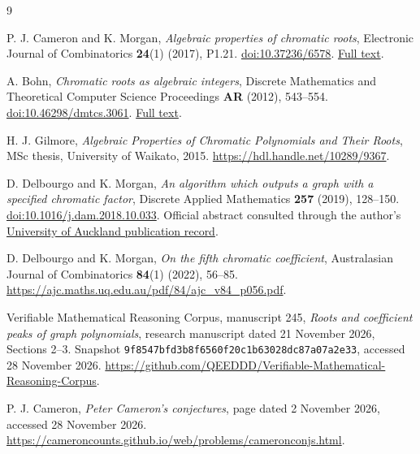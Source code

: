 \documentclass[11pt,a4paper]{article}
\theoremstyle{definition}
\begin{document}
\begin{thebibliography}{9}

P. J. Cameron and K. Morgan,
\emph{Algebraic properties of chromatic roots},
Electronic Journal of Combinatorics \textbf{24}(1) (2017), P1.21.
\href{https://doi.org/10.37236/6578}{doi:10.37236/6578}.
\href{https://emis.de/ft/29131}{Full text}.

A. Bohn, \emph{Chromatic roots as algebraic integers},
Discrete Mathematics and Theoretical Computer Science Proceedings
\textbf{AR} (2012), 543--554.
\href{https://doi.org/10.46298/dmtcs.3061}{doi:10.46298/dmtcs.3061}.
\href{https://www.math.nagoya-u.ac.jp/fpsac12/download/contributed/dmAR0148.pdf}{Full text}.

H. J. Gilmore,
\emph{Algebraic Properties of Chromatic Polynomials and Their Roots},
MSc thesis, University of Waikato, 2015.
\url{https://hdl.handle.net/10289/9367}.

D. Delbourgo and K. Morgan,
\emph{An algorithm which outputs a graph with a specified chromatic factor},
Discrete Applied Mathematics \textbf{257} (2019), 128--150.
\href{https://doi.org/10.1016/j.dam.2018.10.033}{doi:10.1016/j.dam.2018.10.033}.
Official abstract consulted through the author's
\href{https://profiles.auckland.ac.nz/daniel-delbourgo/publications}{University of Auckland publication record}.

D. Delbourgo and K. Morgan, \emph{On the fifth chromatic coefficient},
Australasian Journal of Combinatorics \textbf{84}(1) (2022), 56--85.
\url{https://ajc.maths.uq.edu.au/pdf/84/ajc_v84_p056.pdf}.

Verifiable Mathematical Reasoning Corpus,
manuscript 245, \emph{Roots and coefficient peaks of graph polynomials},
research manuscript dated 21 November 2026, Sections 2--3.
Snapshot \texttt{9f8547bfd3b8f6560f20c1b63028dc87a07a2e33},
accessed 28 November 2026.
\url{https://github.com/QEEDDD/Verifiable-Mathematical-Reasoning-Corpus}.

P. J. Cameron, \emph{Peter Cameron's conjectures},
page dated 2 November 2026, accessed 28 November 2026.
\url{https://cameroncounts.github.io/web/problems/cameronconjs.html}.

\end{thebibliography}
\end{document}
